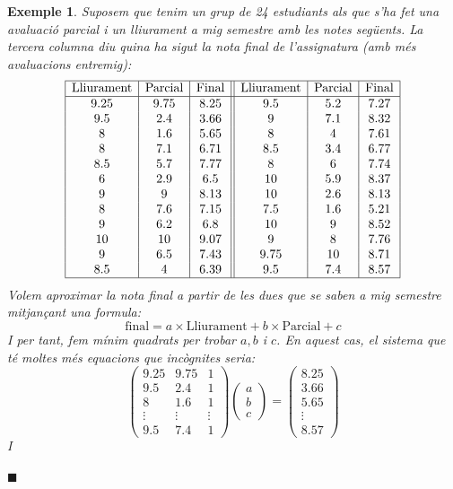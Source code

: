 \documentclass[
  11pt,
]{book}
\numberwithin{dummy}{section}
\theoremstyle{maincolornumbox}
\theoremstyle{blacknumex}
\newtheorem{exampleT}{Exemple}[chapter]
\theoremstyle{blacknumbox}
\theoremstyle{maincolornum}
\newenvironment{example}{\begin{exampleT}}{\hfill{\tiny\ensuremath{\blacksquare}}\end{exampleT}}
\begin{document}
\begin{example}
Suposem que tenim un grup de 24 estudiants als que s'ha fet una
avaluació parcial i un lliurament a mig semestre amb les notes següents.
La tercera columna diu quina ha sigut la nota final de l'assignatura
(amb més avaluacions entremig): \[\begin{array}{|c|c|c||c|c|c|}
\hline \text{Lliurament} & \text{Parcial} & \text{Final} & 
\text{Lliurament} & \text{Parcial} & \text{Final}\\ \hline
9.25 & 9.75 & 8.25 & 
9.5 & 5.2 & 7.27 \\
9.5 & 2.4 & 3.66 &
9 & 7.1 & 8.32 \\
8 & 1.6 & 5.65 &
8 & 4 & 7.61 \\
8 & 7.1 & 6.71 &
8.5 & 3.4 & 6.77 \\
8.5 & 5.7 & 7.77 &
8 & 6 & 7.74 \\
6 & 2.9 & 6.5 &
10 & 5.9 & 8.37 \\
9 & 9 & 8.13 &
10 & 2.6 & 8.13 \\
8 & 7.6 & 7.15 &
7.5 & 1.6 & 5.21 \\
9 & 6.2 & 6.8 &
10 & 9 & 8.52 \\
10 & 10 & 9.07 &
9 & 8 & 7.76 \\
9 & 6.5 & 7.43 &
9.75 & 10 & 8.71 \\
8.5 & 4 & 6.39 &
9.5 & 7.4 & 8.57 \\ \hline
\end{array}\] Volem aproximar la nota final a partir de les dues que se
saben a mig semestre mitjançant una formula:
\[\text{final} = a \times \text{Lliurament} + b \times \text{Parcial} + c\]
I per tant, fem mínim quadrats per trobar \(a,b\) i \(c\). En aquest cas, el
sistema que té moltes més equacions que incògnites seria:
\[\begin{pmatrix}
9.25 & 9.75 & 1 \\
9.5 & 2.4 & 1 \\
8 & 1.6 & 1 \\
\vdots & \vdots & \vdots \\
9.5 & 7.4 & 1
\end{pmatrix}
\begin{pmatrix} a \\ b \\ c \end{pmatrix}=
\begin{pmatrix} 8.25 \\ 3.66 \\ 5.65 \\ \vdots \\ 8.57 \end{pmatrix}\] I

\end{example}
\end{document}
